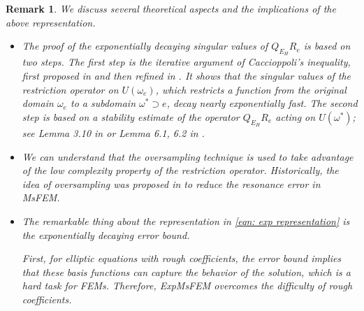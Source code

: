 \documentclass[12pt]{caltech_thesis}
\newtheorem{remark}[theorem]{Remark}
\numberwithin{equation}{section}
\begin{document}
\begin{remark}
    We discuss several theoretical aspects and the implications of the above representation.
    \begin{itemize}
        
        \item The proof of the exponentially decaying singular values of $Q_{E_H}R_e$ is based on two steps. The first step is the iterative argument of Caccioppoli's inequality, first proposed in \cite{babuska2011optimal} and then refined in \cite{ma2021novel}. It shows that the singular values of the restriction operator on $U(\omega_e)$, which restricts a function from the original domain $\omega_e$ to a subdomain $\omega^* \supset e$, decay nearly exponentially fast. The second step is based on a stability estimate of the operator $Q_{E_H}R_e$ acting on $U(\omega^*)$; see Lemma 3.10 in \cite{chen2021exponential} or Lemma 6.1, 6.2 in \cite{chen2023exponentially}. 
        \item We can understand that the oversampling technique is used to take advantage of the low complexity property of the restriction operator. Historically, the idea of oversampling was proposed in \cite{hou_multiscale_1997} to reduce the resonance error in MsFEM.
        \item The remarkable thing about the representation in \eqref{eqn: exp representation} is the exponentially decaying error bound. 
        
        First, for elliptic equations with rough coefficients, the error bound implies that these basis functions can capture the behavior of the solution, which is a hard task for FEMs. Therefore, ExpMsFEM overcomes the difficulty of rough coefficients.
        

\end{itemize}
\end{remark}
\end{document}
